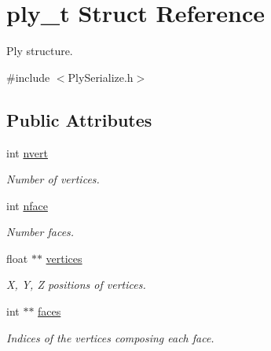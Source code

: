 \hypertarget{structply__t}{}\section{ply\+\_\+t Struct Reference}
\label{structply__t}


Ply structure.  




{\ttfamily \#include $<$Ply\+Serialize.\+h$>$}

\subsection*{Public Attributes}
\begin{DoxyCompactItemize}
\item 
\mbox{\label{structply__t_a8958bfc57c4354ce663eb39972efb08f}} 
int \mbox{\hyperlink{structply__t_a8958bfc57c4354ce663eb39972efb08f}{nvert}}
\begin{DoxyCompactList}\small\item\em Number of vertices. \end{DoxyCompactList}\item 
\mbox{\label{structply__t_a193a6563568843d5c9b21fc9b6f729ce}} 
int \mbox{\hyperlink{structply__t_a193a6563568843d5c9b21fc9b6f729ce}{nface}}
\begin{DoxyCompactList}\small\item\em Number faces. \end{DoxyCompactList}\item 
\mbox{\label{structply__t_ae369adb99bfa7d4ce6c0de17375ceca5}} 
float $\ast$$\ast$ \mbox{\hyperlink{structply__t_ae369adb99bfa7d4ce6c0de17375ceca5}{vertices}}
\begin{DoxyCompactList}\small\item\em X, Y, Z positions of vertices. \end{DoxyCompactList}\item 
\mbox{\label{structply__t_af1d30fca2604f6db56811f4708fe2e4f}} 
int $\ast$$\ast$ \mbox{\hyperlink{structply__t_af1d30fca2604f6db56811f4708fe2e4f}{faces}}
\begin{DoxyCompactList}\small\item\em Indices of the vertices composing each face. \end{DoxyCompactList}\item 

\end{DoxyCompactItemize}
